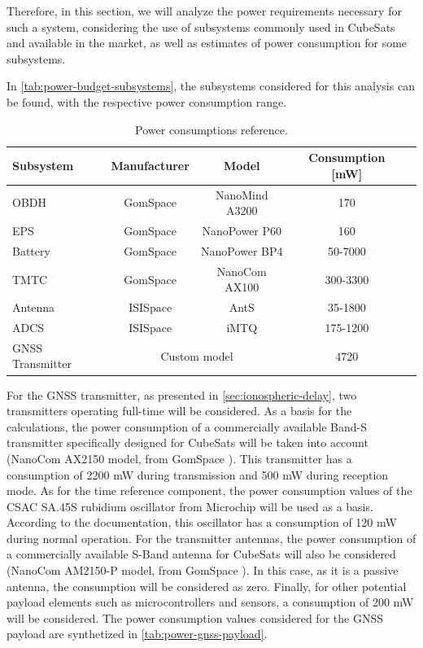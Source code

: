 Therefore, in this section, we will analyze the power requirements necessary for such a system, considering the use of subsystems commonly used in CubeSats and available in the market, as well as estimates of power consumption for some subsystems.

In \autoref{tab:power-budget-subsystems}, the subsystems considered for this analysis can be found, with the respective power consumption range.

\begin{table}[!ht]
    \centering
    \begin{tabular}{lcccc}
        \toprule[1.5pt]
        \textbf{Subsystem} & \textbf{Manufacturer} & \textbf{Model} & \textbf{Consumption [mW]} \\
        \midrule
        OBDH     & GomSpace & NanoMind A3200 & 170 \\
        EPS      & GomSpace & NanoPower P60  & 160 \\
        Battery  & GomSpace & NanoPower BP4  & 50-7000 \\
        TMTC     & GomSpace & NanoCom AX100  & 300-3300 \\
        Antenna  & ISISpace & AntS           & 35-1800 \\
        ADCS     & ISISpace & iMTQ           & 175-1200 \\
        GNSS Transmitter & \multicolumn{2}{c}{Custom model} & 4720 \\
        \bottomrule[1.5pt]
    \end{tabular}
    \caption{Power consumptions reference.}
    \label{tab:power-budget-subsystems}
\end{table}

For the GNSS transmitter, as presented in \autoref{sec:ionospheric-delay}, two transmitters operating full-time will be considered. As a basis for the calculations, the power consumption of a commercially available Band-S transmitter specifically designed for CubeSats will be taken into account (NanoCom AX2150 model, from GomSpace \cite{ax2150}). This transmitter has a consumption of 2200 mW during transmission and 500 mW during reception mode. As for the time reference component, the power consumption values of the CSAC SA.45S rubidium oscillator from Microchip will be used as a basis. According to the documentation, this oscillator has a consumption of 120 mW during normal operation. For the transmitter antennas, the power consumption of a commercially available S-Band antenna for CubeSats will also be considered (NanoCom AM2150-P model, from GomSpace \cite{am2150-p}). In this case, as it is a passive antenna, the consumption will be considered as zero. Finally, for other potential payload elements such as microcontrollers and sensors, a consumption of 200 mW will be considered. The power consumption values considered for the GNSS payload are synthetized in \autoref{tab:power-gnss-payload}.

